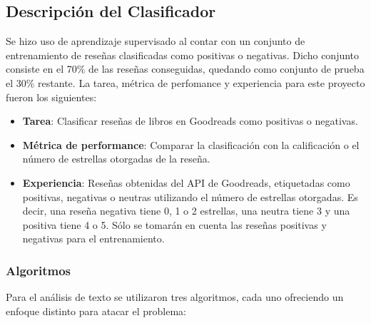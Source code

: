\documentclass[hidelinks]{sig-alternate-05-2015}
\begin{document}
\subsection{Descripción del Clasificador}

Se hizo uso de aprendizaje supervisado al contar con un conjunto de entrenamiento de reseñas clasificadas como positivas o negativas. Dicho conjunto consiste en el 70$\%$ de las reseñas conseguidas, quedando como conjunto de prueba el 30$\%$ restante. La tarea, métrica de perfomance y experiencia para este proyecto fueron los siguientes:

\begin{itemize}
\item \textbf{Tarea}: Clasificar reseñas de libros en Goodreads como positivas o negativas.

\item \textbf{Métrica de performance}: Comparar la clasificación con la calificación o el número de estrellas otorgadas de la reseña.

\item \textbf{Experiencia}: Reseñas obtenidas del API de Goodreads, etiquetadas como positivas, negativas o neutras utilizando el número de estrellas otorgadas. Es decir, una reseña negativa tiene 0, 1 o 2 estrellas, una neutra tiene 3 y una positiva tiene 4 o 5. Sólo se tomarán en cuenta las reseñas positivas y negativas para el entrenamiento.

\end{itemize}

\subsubsection{Algoritmos}

Para el análisis de texto se utilizaron tres algoritmos, cada uno ofreciendo un enfoque distinto para atacar el problema:
\end{document}
